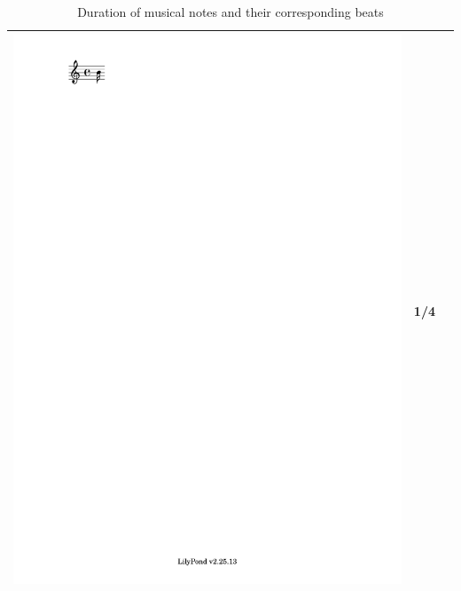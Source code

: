 \documentclass[11pt]{article}
\theoremstyle{definition}
\begin{document}
\begin{table}
\begin{tabular}{|c|c|c|}
\includegraphics[trim=4.29cm 27cm 16cm 1.5cm, clip, scale=1]{sixteenth_note.pdf} & 1/4 \\
\hline
\end{tabular}
\caption{Duration of musical notes and their corresponding beats}
\label{tab:note duration}
\end{table}
\end{document}
